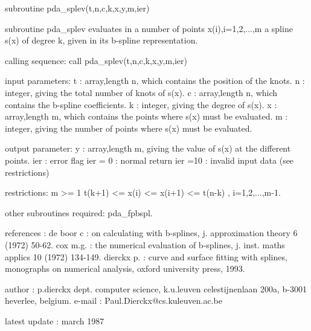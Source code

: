 \documentclass[11pt,twoside,nolof]{starlink}
\begin{document}
\begin{terminalv}
      subroutine pda_splev(t,n,c,k,x,y,m,ier)


  subroutine pda_splev evaluates in a number of points x(i),i=1,2,...,m
  a spline s(x) of degree k, given in its b-spline representation.

  calling sequence:
     call pda_splev(t,n,c,k,x,y,m,ier)

  input parameters:
    t    : array,length n, which contains the position of the knots.
    n    : integer, giving the total number of knots of s(x).
    c    : array,length n, which contains the b-spline coefficients.
    k    : integer, giving the degree of s(x).
    x    : array,length m, which contains the points where s(x) must
           be evaluated.
    m    : integer, giving the number of points where s(x) must be
           evaluated.

  output parameter:
    y    : array,length m, giving the value of s(x) at the different
           points.
    ier  : error flag
      ier = 0 : normal return
      ier =10 : invalid input data (see restrictions)

  restrictions:
    m >= 1
    t(k+1) <= x(i) <= x(i+1) <= t(n-k) , i=1,2,...,m-1.

  other subroutines required: pda_fpbspl.

  references :
    de boor c  : on calculating with b-splines, j. approximation theory
                 6 (1972) 50-62.
    cox m.g.   : the numerical evaluation of b-splines, j. inst. maths
                 applics 10 (1972) 134-149.
    dierckx p. : curve and surface fitting with splines, monographs on
                 numerical analysis, oxford university press, 1993.

  author :
    p.dierckx
    dept. computer science, k.u.leuven
    celestijnenlaan 200a, b-3001 heverlee, belgium.
    e-mail : Paul.Dierckx@cs.kuleuven.ac.be

  latest update : march 1987
\end{terminalv}


\end{document}
